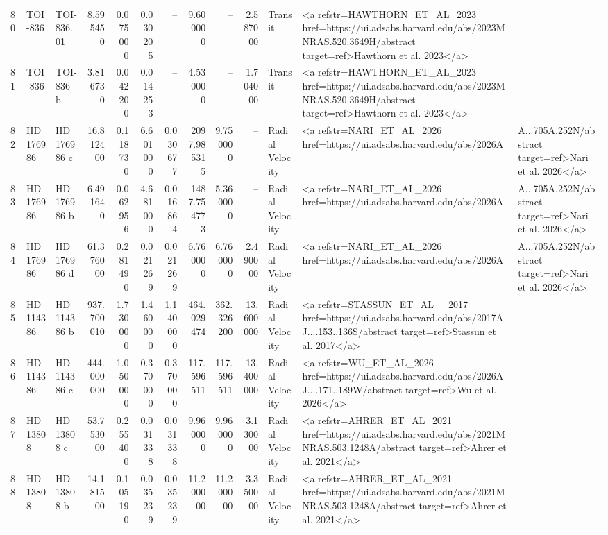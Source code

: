 \begin{tabular}{lllrrrrrrrll}
80 & TOI-836 & TOI-836.01 & 8.595450 & 0.075000 & 0.030205 & -- & 9.600000 & -- & 2.587000 & Transit & <a refstr=HAWTHORN_ET_AL_2023 href=https://ui.adsabs.harvard.edu/abs/2023MNRAS.520.3649H/abstract target=ref>Hawthorn et al. 2023</a> \\
81 & TOI-836 & TOI-836 b & 3.816730 & 0.042200 & 0.014253 & -- & 4.530000 & -- & 1.704000 & Transit & <a refstr=HAWTHORN_ET_AL_2023 href=https://ui.adsabs.harvard.edu/abs/2023MNRAS.520.3649H/abstract target=ref>Hawthorn et al. 2023</a> \\
82 & HD 176986 & HD 176986 c & 16.812400 & 0.118730 & 6.601000 & 0.030677 & 2097.985315 & 9.750000 & -- & Radial Velocity & <a refstr=NARI_ET_AL_2026 href=https://ui.adsabs.harvard.edu/abs/2026A&A...705A.252N/abstract target=ref>Nari et al. 2026</a> \\
83 & HD 176986 & HD 176986 b & 6.491640 & 0.062956 & 4.681000 & 0.016864 & 1487.754773 & 5.360000 & -- & Radial Velocity & <a refstr=NARI_ET_AL_2026 href=https://ui.adsabs.harvard.edu/abs/2026A&A...705A.252N/abstract target=ref>Nari et al. 2026</a> \\
84 & HD 176986 & HD 176986 d & 61.376000 & 0.281490 & 0.021269 & 0.021269 & 6.760000 & 6.760000 & 2.490000 & Radial Velocity & <a refstr=NARI_ET_AL_2026 href=https://ui.adsabs.harvard.edu/abs/2026A&A...705A.252N/abstract target=ref>Nari et al. 2026</a> \\
85 & HD 114386 & HD 114386 b & 937.700010 & 1.730000 & 1.460000 & 1.140000 & 464.029474 & 362.326200 & 13.600000 & Radial Velocity & <a refstr=STASSUN_ET_AL__2017 href=https://ui.adsabs.harvard.edu/abs/2017AJ....153..136S/abstract target=ref>Stassun et al. 2017</a> \\
86 & HD 114386 & HD 114386 c & 444.000000 & 1.050000 & 0.370000 & 0.370000 & 117.596511 & 117.596511 & 13.400000 & Radial Velocity & <a refstr=WU_ET_AL_2026 href=https://ui.adsabs.harvard.edu/abs/2026AJ....171..189W/abstract target=ref>Wu et al. 2026</a> \\
87 & HD 13808 & HD 13808 c & 53.753000 & 0.255400 & 0.031338 & 0.031338 & 9.960000 & 9.960000 & 3.130000 & Radial Velocity & <a refstr=AHRER_ET_AL_2021 href=https://ui.adsabs.harvard.edu/abs/2021MNRAS.503.1248A/abstract target=ref>Ahrer et al. 2021</a> \\
88 & HD 13808 & HD 13808 b & 14.181500 & 0.105190 & 0.035239 & 0.035239 & 11.200000 & 11.200000 & 3.350000 & Radial Velocity & <a refstr=AHRER_ET_AL_2021 href=https://ui.adsabs.harvard.edu/abs/2021MNRAS.503.1248A/abstract target=ref>Ahrer et al. 2021</a> \\

\end{tabular}
